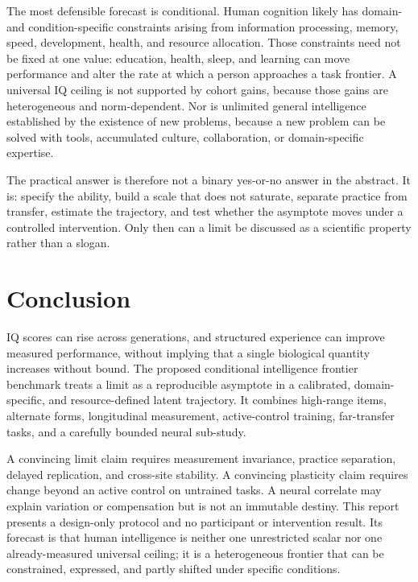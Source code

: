 \documentclass[conference]{IEEEtran}
\begin{document}
The most defensible forecast is conditional. Human cognition likely has domain- and condition-specific constraints arising from information processing, memory, speed, development, health, and resource allocation. Those constraints need not be fixed at one value: education, health, sleep, and learning can move performance and alter the rate at which a person approaches a task frontier. A universal IQ ceiling is not supported by cohort gains, because those gains are heterogeneous and norm-dependent. Nor is unlimited general intelligence established by the existence of new problems, because a new problem can be solved with tools, accumulated culture, collaboration, or domain-specific expertise.

The practical answer is therefore not a binary yes-or-no answer in the abstract. It is: specify the ability, build a scale that does not saturate, separate practice from transfer, estimate the trajectory, and test whether the asymptote moves under a controlled intervention. Only then can a limit be discussed as a scientific property rather than a slogan.

\section{Conclusion}
\label{sec:conclusion}
IQ scores can rise across generations, and structured experience can improve measured performance, without implying that a single biological quantity increases without bound. The proposed conditional intelligence frontier benchmark treats a limit as a reproducible asymptote in a calibrated, domain-specific, and resource-defined latent trajectory. It combines high-range items, alternate forms, longitudinal measurement, active-control training, far-transfer tasks, and a carefully bounded neural sub-study.

A convincing limit claim requires measurement invariance, practice separation, delayed replication, and cross-site stability. A convincing plasticity claim requires change beyond an active control on untrained tasks. A neural correlate may explain variation or compensation but is not an immutable destiny. This report presents a design-only protocol and no participant or intervention result. Its forecast is that human intelligence is neither one unrestricted scalar nor one already-measured universal ceiling; it is a heterogeneous frontier that can be constrained, expressed, and partly shifted under specific conditions.
\end{document}
